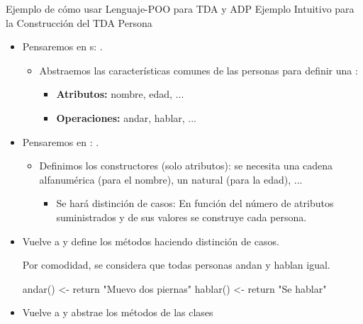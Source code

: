 \documentclass[10pt,envcountsect,spanish]{beamer}
\begin{document}
\begin{frame}[fragile]{Ejemplo de cómo usar Lenguaje-POO para TDA y ADP} {Ejemplo Intuitivo para la Construcción del TDA Persona}

\begin{itemize}

\item Pensaremos en s: .
\begin{itemize}
\item Abstraemos las características comunes de las personas para definir una  :
\begin{itemize}
\item  \textbf{Atributos:} nombre, edad, ...
\item \textbf{Operaciones:} andar, hablar, ...
\end{itemize}
\end{itemize}


\item  Pensaremos en : . 

\begin{itemize}
\item Definimos los constructores (solo atributos): se necesita una cadena alfanumérica (para el nombre), un natural (para la edad), ...

\begin{itemize}
\item Se hará distinción de casos: 
 En función del número de atributos suministrados y de sus valores se construye cada persona.
\end{itemize}

\end{itemize}

\item Vuelve a   y define los métodos haciendo distinción de casos.

Por comodidad, se considera que todas personas andan y hablan igual.

\begin{pyverbatim}
andar() <- return "Muevo dos piernas"
hablar() <- return "Se hablar" 
\end{pyverbatim}


\item  Vuelve a   y  abstrae los métodos de las clases


\end{itemize}
\end{frame}
\end{document}
